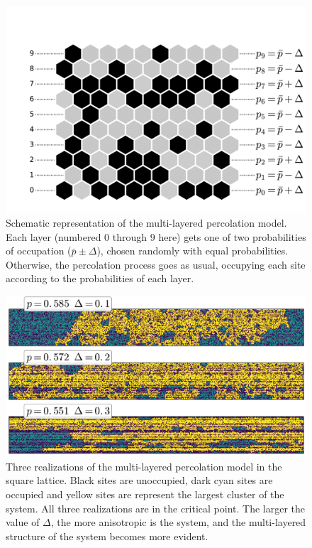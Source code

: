 \begin{figure}
\begin{center}
    \includegraphics[scale=0.4]{chapters/ch5-anis/figs/mlperco_explain}
\end{center}
\caption{Schematic representation of the multi-layered percolation model. Each
    layer (numbered $0$ through $9$ here) gets one of two probabilities of
    occupation ($\bar{p}\pm\Delta$), chosen randomly with equal probabilities.
    Otherwise, the percolation process goes as usual, occupying each site
    according to the probabilities of each layer.}
\label{fig:mlperco_explain}
\end{figure}

\begin{figure}
\begin{center}
    \includegraphics[width=\textwidth]{chapters/ch5-anis/figs/mlperco}
\end{center}
\caption{Three realizations of the multi-layered percolation model in the
    square lattice. Black sites are unoccupied, dark cyan sites are occupied
    and yellow sites are represent the largest cluster of the system. All
    three realizations are in the critical point. The larger the value of
    $\Delta$, the more anisotropic is the system, and the multi-layered
    structure of the system becomes more evident.}
\label{fig:mlperco}
\end{figure}


